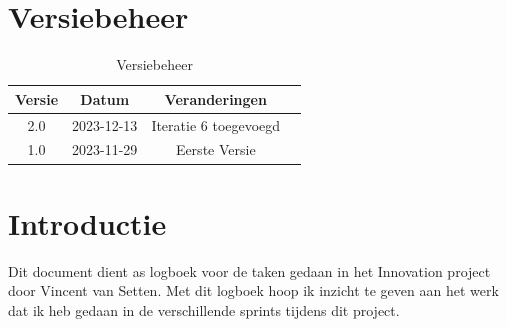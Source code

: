 \documentclass[a4paper]{report}
\begin{document}
\tableofcontents

\chapter{Versiebeheer}
\begin{table}[h]
    \centering
    \begin{tabular}{|c|c|c|p{5cm}|}
        \hline
        \textbf{Versie} & \textbf{Datum} & \textbf{Veranderingen}  \\
        \hline
        2.0   & 2023-12-13 & Iteratie 6 toegevoegd \\
        \hline
        1.0   & 2023-11-29 & Eerste Versie \\
        \hline

    \end{tabular}
    \caption{Versiebeheer}
\end{table}


\chapter{Introductie}
Dit document dient as logboek voor de taken gedaan in het Innovation project door Vincent van Setten.
Met dit logboek hoop ik inzicht te geven aan het werk dat ik heb gedaan in de verschillende sprints tijdens dit project.


\vspace{1.5cm}




    
\end{document}
